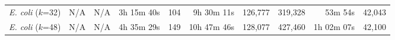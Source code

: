 \begin{table*}
\begin{tabular}{|c|r|r|r|r|r|r|r|r|r|}

    
    \emph{E. coli} ($k$=32)         & N/A & N/A & 3h 15m 40s & 104 & 9h 30m 11s & 126,777 & 319,328 &  53m 54s & 42,043 \\



    \emph{E. coli} ($k$=48)         & N/A & N/A & 4h 35m 29s & 149 & 10h 47m 46s & 128,077 & 427,460 & 1h 02m 07s & 42,100 \\


\end{tabular}
\end{table*}

